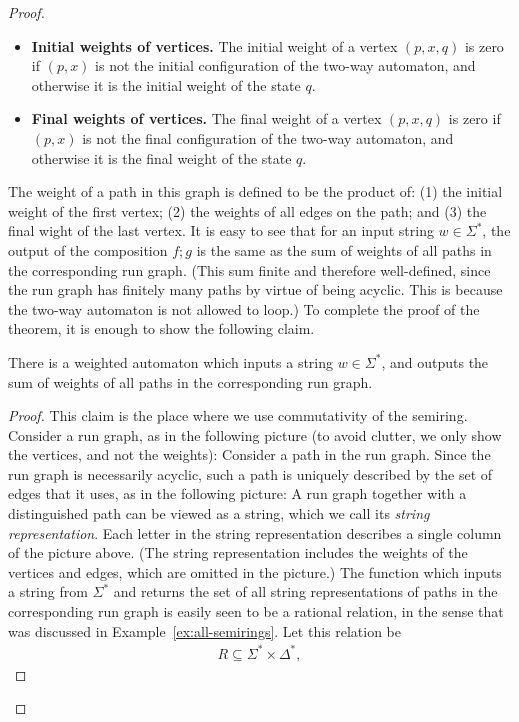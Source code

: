 \begin{proof}
\begin{itemize}
        \item \textbf{Initial weights of vertices.} The initial weight of a vertex $(p,x,q)$ is zero if $(p,x)$ is not the initial configuration of the two-way automaton, and otherwise it is the initial weight of  the state $q$.
        \item \textbf{Final weights of vertices.} The final weight of a vertex $(p,x,q)$ is zero if $(p,x)$ is not the final configuration of the two-way automaton, and otherwise it is the final weight of the state $q$.
    \end{itemize}
The weight of a path in this graph is defined to be the product of: (1) the initial weight of the first vertex; (2) the weights of all edges on the path; and (3) the final wight of the last vertex. It is  easy to see that for an input string $w \in \Sigma^*$, the output of the composition $f;g$ is the same as the sum of weights of all paths in the corresponding run graph.  (This sum finite and therefore well-defined, since the run graph has finitely many paths by virtue of being  acyclic. This is because the two-way automaton is not allowed to loop.) To complete the proof of the theorem, it is enough to show the following claim.
\begin{claim}
    There is a weighted automaton which inputs a string $w \in \Sigma^*$, and outputs the sum of weights of all paths in the corresponding run graph.
\end{claim}
\begin{proof}
    This claim is the place where we use commutativity of the semiring. Consider a run graph, as in the following picture (to avoid clutter, we only show the vertices, and not the weights):
    Consider a path in the run graph. Since the run graph is necessarily acyclic, such a path is uniquely described by the set of edges that it uses, as in the   following picture:  
    A run graph together with a distinguished path can be viewed as a string, which we call its \emph{string representation}. Each letter in the string representation describes a single column of the picture above. (The string representation includes the weights of the vertices and edges, which are omitted in the picture.)     The function which inputs a string from $\Sigma^*$ and returns the set of all string representations of paths in the corresponding run graph is easily seen to be a rational relation, in the sense that was  discussed in Example~\ref{ex:all-semirings}. Let this relation be 
    \begin{align*}
    R \subseteq \Sigma^* \times \Delta^*,

\end{align*}
\end{proof}
\end{proof}
